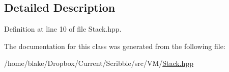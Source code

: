 \subsection{Detailed Description}


Definition at line 10 of file Stack.\-hpp.



The documentation for this class was generated from the following file\-:\begin{DoxyCompactItemize}
\item 
/home/blake/\-Dropbox/\-Current/\-Scribble/src/\-V\-M/\hyperlink{_v_m_2_stack_8hpp}{Stack.\-hpp}\end{DoxyCompactItemize}
